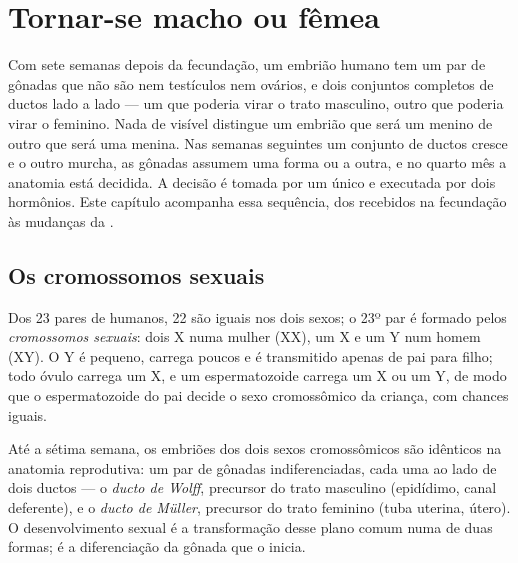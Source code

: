 \chapter{Tornar-se macho ou fêmea}\label{ch:g11:becoming-male-female}

Com sete semanas depois da fecundação, um embrião humano tem um par de
gônadas que não são nem testículos nem ovários, e dois conjuntos
completos de ductos lado a lado --- um que poderia virar o trato
masculino, outro que poderia virar o feminino. Nada de visível
distingue um embrião que será um menino de outro que será uma menina.
Nas semanas seguintes um conjunto de ductos cresce e o outro murcha, as
gônadas assumem uma forma ou a outra, e no quarto mês a anatomia está
decidida. A decisão é tomada por um único  e executada por dois
hormônios. Este capítulo acompanha essa sequência, dos 
recebidos na fecundação às mudanças da .

\section{Os cromossomos sexuais}

\begin{definition}\label{def:g11:becoming-male-female:chromosomes}
Dos 23 pares de  humanos, 22 são iguais nos dois sexos; o
23º par é formado pelos
\emph{cromossomos sexuais}: dois 
X numa mulher (XX), um X e um Y num homem (XY). O Y é pequeno, carrega
poucos  e é transmitido apenas de pai para filho; todo óvulo
carrega um X, e um espermatozoide carrega um X ou um Y, de modo que o
espermatozoide do pai decide o sexo cromossômico da criança, com
chances iguais.
\end{definition}

\begin{proposition}\label{prop:g11:becoming-male-female:undifferentiated}
Até a sétima semana, os embriões dos dois sexos cromossômicos são
idênticos na anatomia reprodutiva: um par de gônadas indiferenciadas,
cada uma ao lado de dois ductos --- o \emph{ducto de Wolff}, precursor
do trato masculino (epidídimo, canal deferente), e o
\emph{ducto de Müller}, precursor do trato feminino (tuba uterina,
útero). O desenvolvimento sexual é a transformação desse plano comum
numa de duas formas; é a diferenciação da gônada que o inicia.
\end{proposition}
\admitted

